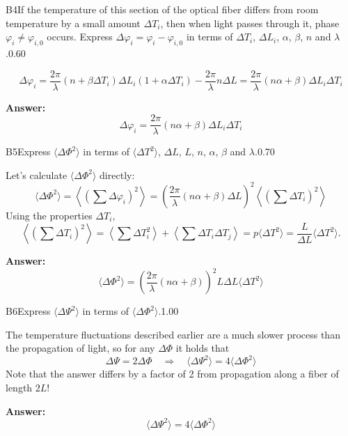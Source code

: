\documentclass[11pt,a4paper]{article}
\begin{document}
\begin{solcard}{B4}{If the temperature of this section of the optical fiber differs from room temperature by a small amount $\Delta T_i$, then when light passes through it, phase $\varphi_i \neq \varphi_{i,0}$ occurs. Express $\Delta \varphi_i = \varphi_i - \varphi_{i,0}$ in terms of $\Delta T_i$, $\Delta L_i$, $\alpha$, $\beta$, $n$ and $\lambda$.}{0.60}

\[ \Delta \varphi_i = \frac{2\pi}{\lambda} (n+\beta \Delta T_i) \Delta L_i (1 + \alpha \Delta T_i) - \frac{2\pi}{\lambda}n \Delta L = \frac{2\pi}{\lambda}(n \alpha + \beta) \Delta L_i \Delta T_i\]

\par\smallskip\noindent\textbf{Answer:} \[ \Delta \varphi_i = \frac{2\pi}{\lambda}(n \alpha + \beta) \Delta L_i \Delta T_i\]
\end{solcard}

\begin{solcard}{B5}{Express $\langle \Delta \Phi^2 \rangle$ in terms of $\langle \Delta T^2 \rangle$, $\Delta L$, $L$, $n$, $\alpha$, $\beta$ and $\lambda$.}{0.70}

Let's calculate $\langle \Delta \Phi^2 \rangle$ directly: \[ \langle \Delta \Phi^2 \rangle = \left\langle \left( \sum\Delta \varphi_i \right)^2 \right\rangle = \left(\frac{2 \pi}{\lambda} (n \alpha + \beta) \Delta L \right)^2 \left\langle \left(\sum \Delta T_i\right)^2 \right\rangle \]Using the properties $\Delta T_i$, \[ \left\langle \left(\sum \Delta T_i\right)^2 \right\rangle = \left\langle \sum \Delta T_i^2 \right\rangle + \left\langle \sum \Delta T_i \Delta T_j \right\rangle = p \langle \Delta T^2 \rangle = \frac{L}{\Delta L} \langle \Delta T^2 \rangle.\]

\par\smallskip\noindent\textbf{Answer:} \[ \langle \Delta \Phi^2 \rangle = \left( \frac{2\pi}{\lambda}(n \alpha + \beta) \right)^2 L \Delta L \langle \Delta T^2 \rangle\]
\end{solcard}

\begin{solcard}{B6}{Express $\langle \Delta \Psi^2 \rangle$ in terms of $\langle \Delta \Phi ^2 \rangle$.}{1.00}

The temperature fluctuations described earlier are a much slower process than the propagation of light, so for any $\Delta \Phi$ it holds that \[ \Delta \Psi = 2 \Delta \Phi \quad \Rightarrow \quad \langle \Delta \Psi^2 \rangle = 4 \langle \Delta \Phi^2 \rangle\]Note that the answer differs by a factor of 2 from propagation along a fiber of length $2L$!

\par\smallskip\noindent\textbf{Answer:} \[ \langle \Delta \Psi^2 \rangle = 4 \langle \Delta \Phi^2 \rangle\]
\end{solcard}
\end{document}
